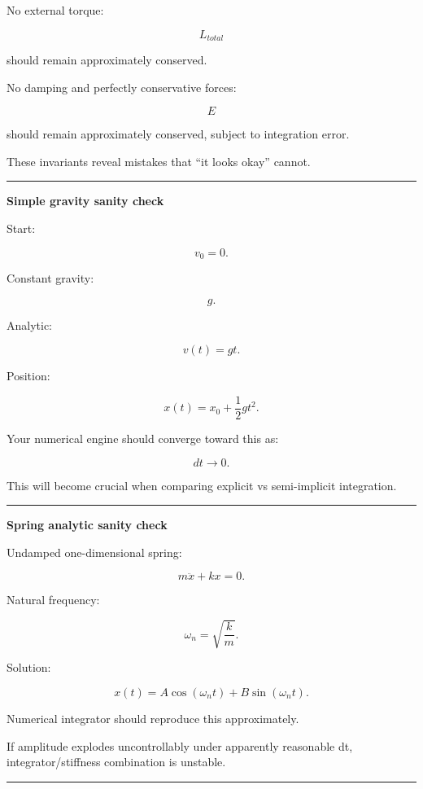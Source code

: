 No external torque:

\[
L_{total}
\]

should remain approximately conserved.

No damping and perfectly conservative forces:

\[
E
\]

should remain approximately conserved, subject to integration error.

These invariants reveal mistakes that ``it looks okay'' cannot.

\begin{center}\rule{0.5\linewidth}{0.5pt}\end{center}

\textbf{Simple gravity sanity check}

Start:

\[
v_0=0.
\]

Constant gravity:

\[
g.
\]

Analytic:

\[
v(t)=gt.
\]

Position:

\[
x(t)
=
x_0+
\frac12gt^2.
\]

Your numerical engine should converge toward this as:

\[
dt\rightarrow0.
\]

This will become crucial when comparing explicit vs semi-implicit integration.

\begin{center}\rule{0.5\linewidth}{0.5pt}\end{center}

\textbf{Spring analytic sanity check}

Undamped one-dimensional spring:

\[
m\ddot x+kx=0.
\]

Natural frequency:

\[
\omega_n=
\sqrt{\frac{k}{m}}.
\]

Solution:

\[
x(t)
=
A\cos(\omega_nt)
+
B\sin(\omega_nt).
\]

Numerical integrator should reproduce this approximately.

If amplitude explodes uncontrollably under apparently reasonable dt, integrator/stiffness combination is unstable.

\begin{center}\rule{0.5\linewidth}{0.5pt}\end{center}

